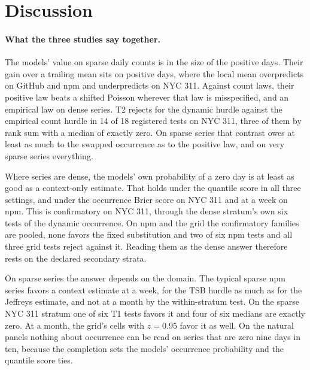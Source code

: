 \providecommand{\lm}{\texttt{local\_mean\_28}}
\providecommand{\qs}{QScore9}
\providecommand{\hc}{\texttt{hurdle\_count\_28}}

\section{Discussion}
\label{sec:discussion}

\paragraph{What the three studies say together.} The models' value on sparse daily counts is in the size of
the positive days. Their gain over a trailing mean sits on positive days, where the local mean overpredicts on
GitHub and npm and underpredicts on NYC 311. Against count laws, their positive law beats a shifted Poisson
wherever that law is misspecified, and an empirical law on dense series. T2 rejects for the dynamic hurdle
against the empirical count hurdle in 14 of 18 registered tests on NYC 311, three of them by rank sum with a
median of exactly zero. On sparse series that contrast owes at least as much to the swapped occurrence as to
the positive law, and on very sparse series everything.

Where series are dense, the models' own probability of a zero day is at least as good as a context-only
estimate. That holds under the quantile score in all three settings, and under the occurrence Brier score on
NYC 311 and at a week on npm. This is confirmatory on NYC 311, through the dense stratum's own six tests of
the dynamic occurrence. On npm and the grid the confirmatory families are pooled, none favors the fixed
substitution and two of six npm tests and all three grid tests reject against it. Reading them as the dense
answer therefore rests on the declared secondary strata.

On sparse series the answer depends on the domain. The typical sparse npm series favors a context estimate at
a week, for the TSB hurdle as much as for the Jeffreys estimate, and not at a month by the within-stratum
test. On the sparse NYC 311 stratum one of six T1 tests favors it and four of six medians are exactly zero. At
a month, the grid's cells with $z = 0.95$ favor it as well. On the natural panels nothing about occurrence can
be read on series that are zero nine days in ten, because the completion sets the models' occurrence
probability and the quantile score ties.

